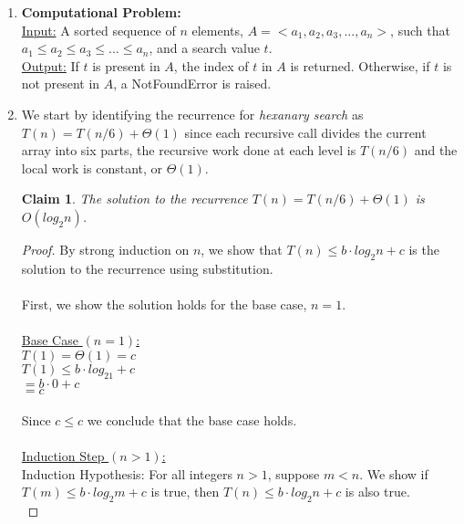 \documentclass[11pt]{article}
\newtheorem{claim}[theorem]{Claim}
\theoremstyle{nonumberplain}
\newtheorem{proof}{Proof}
\begin{document}
\begin{enumerate}
\item \textbf{Computational Problem:} \\
\ul{Input:} A sorted sequence of $n$ elements, $A=<a_1,a_2,a_3,...,a_n>$, such that \\$a_1 \le a_2 \le a_3 \le ... \le a_n$, and a search value $t$. \\

\ul{Output:} If $t$ is present in $A$, the index of $t$ in $A$ is returned. Otherwise, if $t$ is not present in $A$, a NotFoundError is raised.

\item We start by identifying the recurrence for \emph{hexanary search} as $T(n)=T(n/6)+\Theta(1)$ since each recursive call divides the current array into six parts, the recursive work done at each level is $T(n/6)$ and the local work is constant, or $\Theta(1)$.
\begin{claim}
The solution to the recurrence $T(n)=T(n/6)+\Theta(1)$ is $O(log_2n)$.
\end{claim}
\begin{proof}
By strong induction on $n$, we show that $T(n) \le b \cdot log_2n+c$ is the solution to the recurrence using substitution. \\
\\
First, we show the solution holds for the base case, $n=1$. \\
\\
\ul{Base Case $(n=1)$:} \\
$T(1)=\Theta(1)=c$ \\
$T(1) \le b \cdot log_21+c$ \\
\phantom{T(1) }$=b \cdot 0+c$ \\
\phantom{T(1) }$=c$ \\
\\
Since $c \le c$ we conclude that the base case holds. \\
\\
\ul{Induction Step $(n>1)$:} \\
Induction Hypothesis: For all integers $n>1$, suppose $m<n$. We show if $T(m) \le b \cdot log_2m+c$ is true, then $T(n) \le b \cdot log_2n+c$ is also true. \\


\end{proof}
\end{enumerate}
\end{document}
